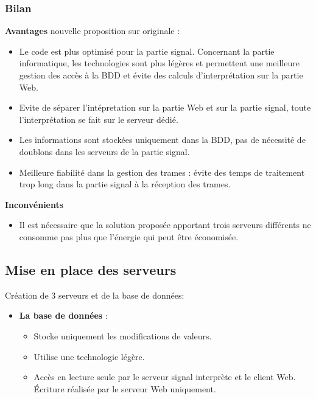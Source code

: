 \documentclass[10pt,a4paper]{article}
\begin{document}
\subsubsection{Bilan}
\textbf{Avantages} nouvelle proposition sur originale :
\begin{itemize}
  \item Le code est plus optimisé pour la partie signal. Concernant la partie informatique, les technologies sont plus légères et permettent une meilleure gestion des accès à la BDD et évite des calculs d'interprétation sur la partie Web.
  \item Evite de séparer l'intépretation sur la partie Web et sur la partie signal, toute l'interprétation se fait sur le serveur dédié.
  \item Les informations sont stockées uniquement dans la BDD, pas de nécessité de doublons dans les serveurs de la partie signal.
  \item Meilleure fiabilité dans la gestion des trames : évite des temps de traitement trop long dans la partie signal à la réception des trames.
\end{itemize}
\textbf{Inconvénients}
\begin{itemize}
  \item Il est nécessaire que la solution proposée apportant trois serveurs différents ne consomme pas plus que l'énergie qui peut être économisée.
\end{itemize}

\subsection{Mise en place des serveurs}

Création de 3 serveurs et de la base de données:

\begin{itemize}
  \item \textbf{La base de données} :
  \begin{itemize}
    \item Stocke uniquement les modifications de valeurs.
    \item Utilise une technologie légère.
    \item Accès en lecture seule par le serveur signal interprète et le client Web. Écriture réalisée par le serveur Web uniquement.
  \end{itemize}
\end{itemize}
\end{document}
